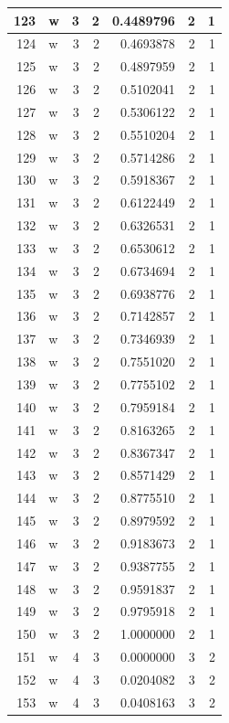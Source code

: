 \documentclass[
  letterpaper,
  DIV=11,
  numbers=noendperiod]{scrreprt}
\begin{document}
\begin{table}
\begin{tabular}[t]{r|l|r|r|r|r|r}
\hline
123 & w & 3 & 2 & 0.4489796 & 2 & 1\\
\hline
124 & w & 3 & 2 & 0.4693878 & 2 & 1\\
\hline
125 & w & 3 & 2 & 0.4897959 & 2 & 1\\
\hline
126 & w & 3 & 2 & 0.5102041 & 2 & 1\\
\hline
127 & w & 3 & 2 & 0.5306122 & 2 & 1\\
\hline
128 & w & 3 & 2 & 0.5510204 & 2 & 1\\
\hline
129 & w & 3 & 2 & 0.5714286 & 2 & 1\\
\hline
130 & w & 3 & 2 & 0.5918367 & 2 & 1\\
\hline
131 & w & 3 & 2 & 0.6122449 & 2 & 1\\
\hline
132 & w & 3 & 2 & 0.6326531 & 2 & 1\\
\hline
133 & w & 3 & 2 & 0.6530612 & 2 & 1\\
\hline
134 & w & 3 & 2 & 0.6734694 & 2 & 1\\
\hline
135 & w & 3 & 2 & 0.6938776 & 2 & 1\\
\hline
136 & w & 3 & 2 & 0.7142857 & 2 & 1\\
\hline
137 & w & 3 & 2 & 0.7346939 & 2 & 1\\
\hline
138 & w & 3 & 2 & 0.7551020 & 2 & 1\\
\hline
139 & w & 3 & 2 & 0.7755102 & 2 & 1\\
\hline
140 & w & 3 & 2 & 0.7959184 & 2 & 1\\
\hline
141 & w & 3 & 2 & 0.8163265 & 2 & 1\\
\hline
142 & w & 3 & 2 & 0.8367347 & 2 & 1\\
\hline
143 & w & 3 & 2 & 0.8571429 & 2 & 1\\
\hline
144 & w & 3 & 2 & 0.8775510 & 2 & 1\\
\hline
145 & w & 3 & 2 & 0.8979592 & 2 & 1\\
\hline
146 & w & 3 & 2 & 0.9183673 & 2 & 1\\
\hline
147 & w & 3 & 2 & 0.9387755 & 2 & 1\\
\hline
148 & w & 3 & 2 & 0.9591837 & 2 & 1\\
\hline
149 & w & 3 & 2 & 0.9795918 & 2 & 1\\
\hline
150 & w & 3 & 2 & 1.0000000 & 2 & 1\\
\hline
151 & w & 4 & 3 & 0.0000000 & 3 & 2\\
\hline
152 & w & 4 & 3 & 0.0204082 & 3 & 2\\
\hline
153 & w & 4 & 3 & 0.0408163 & 3 & 2\\

\end{tabular}
\end{table}
\end{document}
